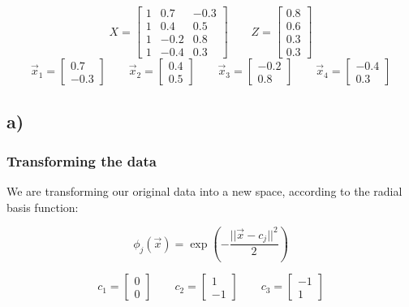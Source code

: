 \documentclass{article}
\begin{document}
\[ X = \begin{bmatrix} 1 & 0.7 & -0.3 \\ 1 & 0.4 & 0.5 \\ 1 & -0.2 & 0.8 \\ 1 & -0.4 & 0.3 \end{bmatrix} \qquad Z = \begin{bmatrix} 0.8 \\ 0.6 \\ 0.3 \\ 0.3 \end{bmatrix} \]
\[ \vec{x}_1 = \begin{bmatrix} 0.7 \\ -0.3 \end{bmatrix} \qquad \vec{x}_2 = \begin{bmatrix} 0.4 \\ 0.5 \end{bmatrix} \qquad \vec{x}_3 = \begin{bmatrix} -0.2 \\ 0.8 \end{bmatrix} \qquad \vec{x}_4 = \begin{bmatrix} -0.4 \\ 0.3 \end{bmatrix} \]

\subsection*{a)}

\subsubsection*{Transforming the data}

We are transforming our original data into a new space, according to the radial basis function:

\[ \phi_j(\vec{x}) = \exp \left( - \frac{||\vec{x} - c_j||^2}{2} \right) \]

\[ c_1 = \begin{bmatrix} 0 \\ 0 \end{bmatrix} \qquad c_2 = \begin{bmatrix} 1 \\ -1 \end{bmatrix} \qquad c_3 = \begin{bmatrix} -1 \\ 1 \end{bmatrix} \]
\end{document}
